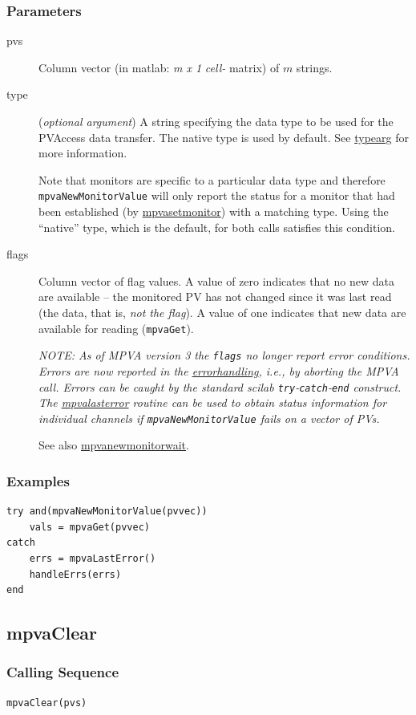 \documentclass{article}
\newcommand{\sca}{\ita{MPVA}}
\newcommand{\scilab}{\ita{scilab}}
\newcommand{\com}[1]{{\tt #1}}
\newcommand{\pbrk}{\pagebreak[3]}
\newcommand{\comref}[2]{\hyperref{\com{#1}}{\com{#1} (see }{)}{#2}}
\newcommand{\ita}[1]{\emph{#1}}
\newcommand{\m}{$m$}
\newcommand{\mhack}{$m$} %
\newcommand{\mxl}{$m\times 1$}
\renewcommand{\m}{\ita{m}}
\newcommand{\mhack}{\ita{m}} %
\renewcommand{\mxl}{\ita{m x 1}}
\renewcommand{\pbrk}{}
\newcommand{\PVITEM}{
\item[pvs] Column vector (in matlab: \mxl{} \ita{cell-} matrix)
of \mhack{} strings.
}
\begin{document}
\subsubsection{Parameters}
\begin{description}
\PVITEM
\item[type]
(\ita{optional argument}) A string specifying the
data type to be used for the PVAccess data transfer. The
native type is used by default.
See \hyperref{here}{(}{)}{typearg} for more information.

Note that monitors are specific to a particular data type and therefore
\com{mpvaNewMonitorValue} will only report the status for a monitor that had been established
(by \comref{mpvaSetMonitor}{mpvasetmonitor}) with a matching type.
Using the ``native'' type, which is the default, for both calls
satisfies this condition.
\item[flags]
Column vector of flag values. A value of zero indicates that no new data are available --
the monitored PV has not changed since it was last read (the data, that is, {\em not the flag}).
A value of one indicates that new data are available for reading (\com{mpvaGet}).

{\em NOTE: As of \sca{} version 3 the \com{flags} no longer report error conditions.
Errors are now reported in the 
\hyperref{standard way}{standard way (see~}{)}{errorhandling},
i.e., by aborting the \sca{} call.
Errors can be caught by the standard \scilab{} \com{try}-\com{catch}-\com{end}
construct. The \comref{mpvaLastError}{mpvalasterror} routine can be used to obtain
status information for individual channels if \com{mpvaNewMonitorValue} fails on
a vector of PVs.}

See also \comref{mpvaNewMonitorWait}{mpvanewmonitorwait}.
\end{description}
\subsubsection{Examples}
\begin{verbatim}
try and(mpvaNewMonitorValue(pvvec))
	vals = mpvaGet(pvvec)
catch
    errs = mpvaLastError()
	handleErrs(errs)
end
\end{verbatim}

\pbrk
\subsection{mpvaClear}
\label{mpvaclear}
\subsubsection{Calling Sequence}
\begin{verbatim}
mpvaClear(pvs)
\end{verbatim}
\end{document}
